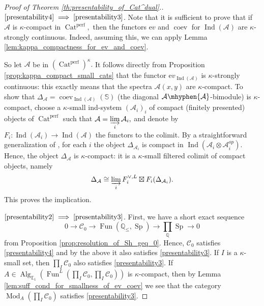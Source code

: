 \documentclass[11pt,leqno]{amsart}
\newcommand{\Implies}[2]{$\text{\ref{#1}}\implies\text{\ref{#2}}$}
\numberwithin{equation}{section}
\def\bS{\mathbb{S}}
\def\Q{\mathbb{Q}}
\newcommand{\hy}{\mhyphen}
\newcommand{\indlim}[1][]{\mathop{\varinjlim}\limits_{#1}}
\newcommand{\prodd}[1][]{\mathop{\prod}\limits_{#1}}
\newcommand{\Cat}{\operatorname{Cat}}
\newcommand{\bE}{{\mathbb E}}
\newcommand{\ev}{\mathrm ev}
\newcommand{\cA}{{\mathcal A}}
\newcommand{\cC}{{\mathcal C}}
\newcommand{\Fun}{\operatorname{Fun}}
\newcommand{\perf}{\operatorname{perf}}
\newcommand{\Sp}{\operatorname{Sp}}
\newcommand{\Ind}{\operatorname{Ind}}
\newcommand{\Alg}{\operatorname{Alg}}
\newcommand{\coev}{\operatorname{coev}}
\newcommand{\Mod}{\operatorname{Mod}}
\begin{document}
\begin{proof}[Proof of Theorem \ref{th:presentability_of_Cat^dual}.]
\Implies{presentability4}{presentability3}. Note that it is sufficient to prove that if $\cA$ is $\kappa$-compact in $\Cat^{\perf},$ then the functors $\ev$ and $\coev$ for $\Ind(\cA)$ are $\kappa$-strongly continuous. Indeed, assuming this, we can apply Lemma \ref{lem:kappa_compactness_for_ev_and_coev}.

So let $\cA$ be in $(\Cat^{\perf})^{\kappa}.$ It follows directly from Proposition \ref{prop:kappa_compact_small_cats} that the functor $\ev_{\Ind(\cA)}$ is $\kappa$-strongly continuous: this exactly means that the spectra $\cA(x,y)$ are $\kappa$-compact. To show that $\Delta_{\cA}=\coev_{\Ind(\cA)}(\bS)$ (the diagonal $\cA\hy\cA$-bimodule) is $\kappa$-compact, choose a $\kappa$-small ind-system $(\cA_i)_i$ of compact (finitely presented) objects of $\Cat^{\perf}$ such that $\cA=\indlim[i]\cA_i,$ and denote by $F_i:\Ind(\cA_i)\to\Ind(\cA)$ the functors to the colimit. By a straightforward generalization of \cite[Proposition 2.14]{TV07}, for each $i$ the object $\Delta_{\cA_i}$ is compact in $\Ind(\cA_i\otimes\cA_i^{op}).$ Hence, the object $\Delta_{\cA}$ is $\kappa$-compact: it is a $\kappa$-small filtered colimit of compact objects, namely
$$\Delta_{\cA}\cong\indlim[i]F_i^{\vee,L}\boxtimes F_i(\Delta_{\cA_i}).$$
This proves the implication.


\Implies{presentability2}{presentability3}. First, we have a short exact sequence
$$0\to \cC_0\to\Fun(\Q_{\leq},\Sp)\to \prodd[\Q]\Sp\to 0$$
from Proposition \ref{prop:resolution_of_Sh_geq_0}. Hence, $\cC_0$ satisfies \ref{presentability4} and by the above it also satisfies \ref{presentability3}. If $I$ is a $\kappa$-small set, then $\prod\limits_I \cC_0$ also satisfies \ref{presentability3}. If $A\in\Alg_{\bE_1}(\Fun^{L}(\prod\limits_I \cC_0,\prod\limits_I \cC_0))$ is $\kappa$-compact, then by Lemma \ref{lem:suff_cond_for_smallness_of_ev_coev} we see that the category $\Mod_A(\prod\limits_I \cC_0)$ satisfies \ref{presentability3}.


\end{proof}
\end{document}
